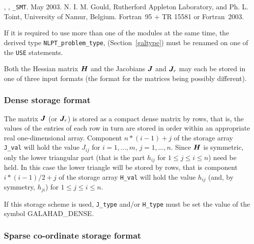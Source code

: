 \documentclass{galahad}
\newcommand{\packagename}{NLPT}
\newcommand{\fullpackagename}{\libraryname\_\packagename}
\newcommand{\sym}{\sf\small}
\begin{document}

\galattributes
\galversions{\tt  \fullpackagename\_single, \fullpackagename\_double},
, {\tt \libraryname\_SMT}.
\galdate May 2003.
\galorigin N. I. M. Gould, Rutherford Appleton Laboratory, and
Ph. L. Toint, University of Namur, Belgium.
\gallanguage Fortran~95 + TR 15581 or Fortran~2003. 


\galhowto



\noindent
If it is required to use more than one of the modules at the same time, 
the derived type
{\tt NLPT\_problem\_type}, 
(Section~\ref{galtype})
must be renamed on one of the {\tt USE} statements.


\galmatrix
Both the Hessian matrix ${\bm{H}}$ and the Jacobians ${\bm{J}}$ and ${\bm{J}}_r$ may
each be stored in one of three input formats (the format for the matrices
being possibly different).

\subsubsection{Dense storage format}\label{dense}

The matrix ${\bm{J}}$ (or ${\bm{J}}_r$) is stored as a compact 
dense matrix by rows, that is, the values of the entries of each row in turn are
stored in order within an appropriate real one-dimensional array.
Component $n \ast (i-1) + j$ of the storage array {\tt J\_val} will hold the 
value $J_{ij}$ for $i = 1, \ldots , m$, $j = 1, \ldots , n$.
Since ${\bm{H}}$ is symmetric, only the lower triangular part (that is the part 
$h_{ij}$ for $1 \leq j \leq i \leq n$) need be held. In this case
the lower triangle will be stored by rows, that is 
component $i \ast (i-1)/2 + j$ of the storage array {\tt H\_val}  
will hold the value $h_{ij}$ (and, by symmetry, $h_{ji}$)
for $1 \leq j \leq i \leq n$.

\noindent
If this storage scheme is used, {\tt J\_type} and/or {\tt H\_type} must be set
the value of the symbol {\sym GALAHAD\_DENSE}.

\subsubsection{Sparse co-ordinate storage format}\label{coordinate}
\end{document}

